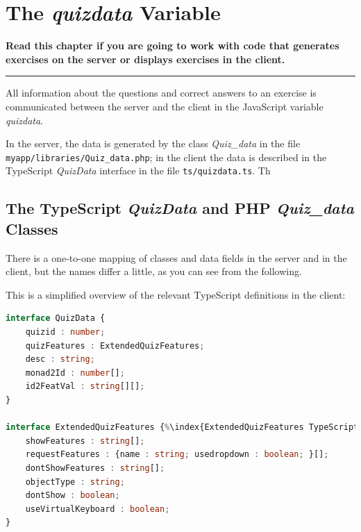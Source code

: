 \documentclass[11pt,oneside,a4paper]{memoir}
\begin{document}
\chapter{The \emph{quizdata} Variable}\label{chap-quizdata}%

\textbf{Read this chapter if you are going to work with code that generates exercises on
  the server or displays exercises in the client.} 
\plainbreak{3}

All information about the questions and correct answers to an exercise is communicated between the
server and the client in the JavaScript variable \emph{quizdata}.

In the server, the data is generated by the class \emph{Quiz\_data} in the file
\texttt{myapp/\allowbreak{}libraries/\allowbreak{}Quiz\_data.php}; in the client the data is described in the TypeScript
\emph{QuizData} interface in the file \texttt{ts/quizdata.ts}. Th



\section{The TypeScript \emph{QuizData} and PHP \emph{Quiz\_data} Classes}%
%

There is a one-to-one mapping of classes and data fields in the server and in the client, but the
names differ a little, as you can see from the following.

This is a simplified overview of the relevant TypeScript definitions in the client:

\begin{lstlisting}[language=TypeScript]
interface QuizData {
    quizid : number;
    quizFeatures : ExtendedQuizFeatures;
    desc : string;
    monad2Id : number[];
    id2FeatVal : string[][];
}

interface ExtendedQuizFeatures {%\index{ExtendedQuizFeatures TypeScript interface@\emph{ExtendedQuizFeatures} TypeScript interface}%
    showFeatures : string[];
    requestFeatures : {name : string; usedropdown : boolean; }[];
    dontShowFeatures : string[];
    objectType : string;
    dontShow : boolean;
    useVirtualKeyboard : boolean;
}
\end{lstlisting}
\end{document}
